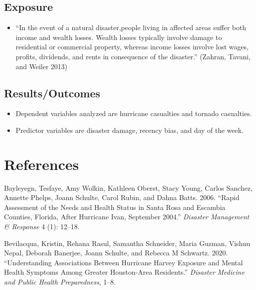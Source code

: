 \documentclass[
]{article}
\providecommand{\tightlist}{%
  \setlength{\itemsep}{0pt}\setlength{\parskip}{0pt}}
\begin{document}
\hypertarget{exposure-7}{%
\subsection{Exposure}\label{exposure-7}}

\begin{itemize}
\tightlist
\item
  ``In the event of a natural disaster,people living in affected areas
  suffer both income and wealth losses. Wealth losses typically involve
  damage to residential or commercial property, whereas income losses
  involve lost wages, proﬁts, dividends, and rents in consequence of the
  disaster.'' (Zahran, Tavani, and Weiler 2013)
\end{itemize}

\hypertarget{resultsoutcomes-9}{%
\subsection{Results/Outcomes}\label{resultsoutcomes-9}}

\begin{itemize}
\tightlist
\item
  Dependent variables analyzed are hurricane casualties and tornado
  casualties.
\item
  Predictor variables are disaster damage, recency bias, and day of the
  week.
\end{itemize}

\hypertarget{references}{%
\section*{References}\label{references}}

\hypertarget{refs}{}
\leavevmode\hypertarget{ref-bayleyegn2006rapid}{}%
Bayleyegn, Tesfaye, Amy Wolkin, Kathleen Oberst, Stacy Young, Carlos
Sanchez, Annette Phelps, Joann Schulte, Carol Rubin, and Dahna Batts.
2006. ``Rapid Assessment of the Needs and Health Status in Santa Rosa
and Escambia Counties, Florida, After Hurricane Ivan, September 2004.''
\emph{Disaster Management \& Response} 4 (1): 12--18.

\leavevmode\hypertarget{ref-bevilacqua2020understanding}{}%
Bevilacqua, Kristin, Rehana Rasul, Samantha Schneider, Maria Guzman,
Vishnu Nepal, Deborah Banerjee, Joann Schulte, and Rebecca M Schwartz.
2020. ``Understanding Associations Between Hurricane Harvey Exposure and
Mental Health Symptoms Among Greater Houston-Area Residents.''
\emph{Disaster Medicine and Public Health Preparedness}, 1--8.
\end{document}
